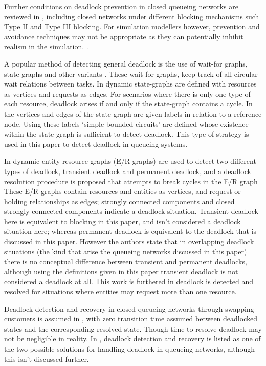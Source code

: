 \documentclass{article}
\numberwithin{equation}{section}
\begin{document}
Further conditions on deadlock prevention in closed queueing networks are reviewed in \cite{onvural90}, including closed networks under different blocking mechanisms such Type II and Type III blocking.
For simulation modellers however, prevention and avoidance techniques may not be appropriate as they can potentially inhibit realism in the simulation. \cite{venkateshetal98}.

A popular method of detecting general deadlock is the use of wait-for graphs, state-graphs and other variants \cite{cheng90, elmagarmid86, coffmanelphick71, choetal95, deuermeyeretal97, venkateshetal98}.
These wait-for graphs, keep track of all circular wait relations between tasks.
In \cite{coffmanelphick71} dynamic state-graphs are defined with resources as vertices and requests as edges.
For scenarios where there is only one type of each resource, deadlock arises if and only if the state-graph contains a cycle.
In \cite{choetal95} the vertices and edges of the state graph are given labels in relation to a reference node.
Using these labels `simple bounded circuits' are defined whose existence within the state graph is sufficient to detect deadlock.
This type of strategy is used in this paper to detect deadlock in queueing systems.

In \cite{deuermeyeretal97} dynamic entity-resource graphs (E/R graphs) are used to detect two different types of deadlock, transient deadlock and permanent deadlock, and a deadlock resolution procedure is proposed that attempts to break cycles in the E/R graph
These E/R graphs contain resources and entities as vertices, and request or holding relationships as edges; strongly connected components and closed strongly connected components indicate a deadlock situation.
Transient deadlock here is equivalent to blocking in this paper, and isn't considered a deadlock situation here; whereas permanent deadlock is equivalent to the deadlock that is discussed in this paper.
However the authors state that in overlapping deadlock situations (the kind that arise the queueing networks discussed in this paper) there is no conceptual difference between transient and permanent deadlocks, although using the definitions given in this paper transient deadlock is not considered a deadlock at all.
This work is furthered in \cite{venkateshetal98} deadlock is detected and resolved for situations where entities may request more than one resource.

Deadlock detection and recovery in closed queueing networks through swapping customers is assumed in \cite{perrosetal88}, with zero transition time assumed between deadlocked states and the corresponding resolved state. Though time to resolve deadlock may not be negligible in reality.
In \cite{akyildiz89}, deadlock detection and recovery is listed as one of the two possible solutions for handling deadlock in queueing networks, although this isn't discussed further.
\end{document}
